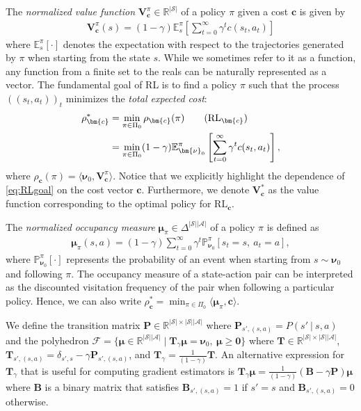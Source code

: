\documentclass[10pt]{article} %
\def\Ac{\ensuremath{\mathcal{A}}}
\def\F{\ensuremath{\mathcal{F}}}
\def\sP{{\mathbb{P}}}
\def\mB{{\bm{B}}}
\def\mP{{\bm{P}}}
\def\mT{{\bm{T}}}
\def\mTg{{\bm{T}}_\gamma}
\def\vzero{{\bm{0}}}
\def\vc{{\bm{c}}}
\def\vV{{\bm{V}}}
\def\vmu{{\bm{\mu}}}
\def\vnu{{\bm{\nu}}}
\def\evc{{c}}
\newcommand{\E}{\mathbb{E}}
\newcommand{\R}{\mathbb{R}}
\newcommand{\St}{\mathcal{S}}
\begin{document}
The \textit{normalized value function} $\vV^\pi_{\vc} \in \R^{|\St|}$ of a policy $\pi$ given a cost $\vc$ is given by
\begin{align*}
    \vV^\pi_{\vc}(s) = (1-\gamma)\E^\pi_s \left[ \sum^\infty_{t=0} \gamma^t \evc(s_t,a_t)\right]
\end{align*}
where $\E^\pi_s[\cdot]$ denotes the expectation with respect to the trajectories generated by $\pi$ when starting from the state $s$. While we sometimes refer to it as a function, any function from a finite set to the reals can be naturally represented as a vector. The fundamental goal of RL is to find a policy $\pi$ such that the process $((s_t,a_t))_t$ minimizes the \textit{total expected cost}:
\begin{align*}
      \rho^*_\vc &= \min_{\pi\in\Pi_0} \rho_{\vc}(\pi) \tag{$\text{RL}_\vc$} \label{eq:RLgoal}\\
      &= \min_{\pi\in\Pi_0} (1-\gamma) \E^\pi_{\vnu_0} \left[ \sum\limits_{t=0}^{\infty} \gamma^t \evc(s_t, a_t) \right],
\end{align*}
where $\rho_{\vc}(\pi) = \langle \vnu_0, \vV^\pi_{\vc}\rangle$. Notice that we explicitly highlight the dependence of \eqref{eq:RLgoal} on the cost vector $\vc$. Furthermore, we denote $\vV^*_\vc$ as the value function corresponding to the optimal policy for $\text{RL}_\vc$. \par

The \textit{normalized occupancy measure} $\vmu_\pi \in \Delta^{|\St||\Ac|}$ of a policy $\pi$ is defined as 
\begin{align*}
    \vmu_\pi(s,a) = (1-\gamma)\sum\limits_{t=0}^\infty \gamma^t \sP^\pi_{\vnu_0}[s_t =s,\: a_t = a],
\end{align*}
where $\sP^\pi_{\vnu_0}[\cdot]$ represents the probability of an event when starting from $s\sim\vnu_0$ and following $\pi$. The occupancy measure of a state-action pair can be interpreted as the discounted visitation frequency of the pair when following a particular policy. Hence, we can also write $\rho^*_\vc = \min_{\pi\in\Pi_0}\langle \vmu_\pi, \vc \rangle$.\par

We define the transition matrix $\mP \in \R^{|\St|\times |\St||\Ac|}$ where $\mP_{s',(s,a)} = P(s'\:|\:s,a) $ and the polyhedron $\F = \{\vmu\in\R^{|\St||\Ac|} \mid \mTg\vmu = \vnu_0, \: \vmu\geq \vzero\}$ where $\mT \in \R^{|\St|\times |\St||\Ac|}$, $\mT_{s',(s,a)} = \delta_{s',s} - \gamma \mP_{s',(s,a)}$, and $\mTg = \frac{1}{(1-\gamma)}\mT$. An alternative expression for $\mTg$ that is useful for computing gradient estimators is $\mTg\vmu = \frac{1}{(1-\gamma)}(\mB- \gamma\mP)\vmu$ where $\mB$ is a binary matrix that satisfies $\mB_{s',(s,a)} = 1$ if $s'=s$ and $\mB_{s',(s,a)} = 0$ otherwise.\par
\end{document}
